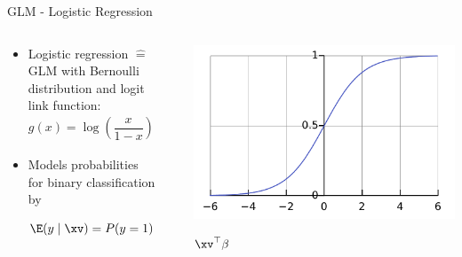 \documentclass[11pt,compress,t,notes=noshow, aspectratio=169, xcolor=table]{beamer}
\begin{document}
\begin{frame}{GLM - Logistic Regression}
\begin{columns}[T, totalwidth=\textwidth]
\begin{column}{0.62\textwidth}

\begin{itemize}
    \item<1-> Logistic regression $\hat{=}$ GLM with Bernoulli distribution and logit link function: 
    $$g(x) = \log\left(\frac{x}{1 - x}\right) \; \Rightarrow \; g^{-1}(x) = \frac{1}{1+\exp(-x)} $$
    \item<1-> Models probabilities for binary classification by
    $$\E(y \mid \xv) = P(y = 1) = g^{-1}(\xv^\top \beta) = \frac{1}{1 + \exp(- \xv^\top \beta)} $$
        \end{itemize}
\end{column}
\begin{column}{0.38\textwidth}

\begin{columns}[c, totalwidth=\linewidth]
\begin{column}{0.005\linewidth}
\scriptsize
{}
\end{column}
\begin{column}{0.995\linewidth}
\includegraphics[width = \textwidth]{figure/Logistic-curve.pdf}
\scriptsize\centerline{$\xv^\top \beta$}
\end{column}
\end{columns}



\end{column}
\end{columns}
\end{frame}
\end{document}
